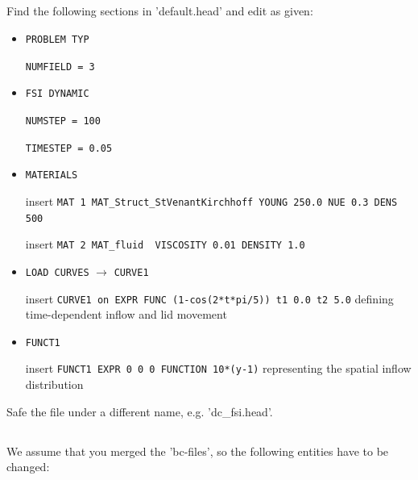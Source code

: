 \subsection{\head}
Find the following sections in 'default.head' and edit as given:
\begin{itemize}
 \item \verb|PROBLEM TYP|

 \verb|NUMFIELD = 3|
 \item \verb|FSI DYNAMIC|

 \verb|NUMSTEP = 100|

 \verb|TIMESTEP = 0.05|

 \item \verb|MATERIALS|

  insert \verb|MAT 1 MAT_Struct_StVenantKirchhoff YOUNG 250.0 NUE 0.3 DENS 500|
  
  insert \verb|MAT 2 MAT_fluid  VISCOSITY 0.01 DENSITY 1.0|

  \item \verb|LOAD CURVES| $\to$ \verb|CURVE1|

  insert \verb|CURVE1 on EXPR FUNC (1-cos(2*t*pi/5)) t1 0.0 t2 5.0| defining time-dependent inflow and lid movement
 
   \item \verb|FUNCT1|

  insert \verb|FUNCT1 EXPR 0 0 0 FUNCTION 10*(y-1)| representing the spatial inflow distribution

\end{itemize}
Safe the file under a different name, e.g. 'dc\_fsi.head'.

\subsection{\bc}
We assume that you merged the 'bc-files', so the following entities have to be changed:

